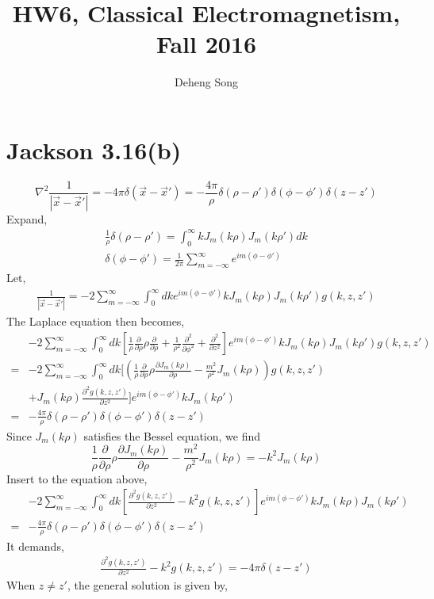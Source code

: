 \documentclass{article}
\newcommand{\pd}[2]{\frac{\partial#1}{\partial#2}}
\begin{document}
\title{HW6, Classical Electromagnetism, Fall 2016}
\author{Deheng Song}
\maketitle

\section*{Jackson 3.16(b)}
\[ \nabla^2\frac{1}{|\vec x-\vec x'|}=-4\pi\delta(\vec x-\vec x')=-\frac{4\pi}{\rho}\delta(\rho-\rho')\delta(\phi-\phi')\delta(z-z') \]
Expand,
\begin{align*}
  \frac{1}{\rho}\delta(\rho-\rho')=\int_0^\infty kJ_m(k\rho)J_m(k\rho')dk\\
  \delta(\phi-\phi')=\frac{1}{2\pi}\sum_{m=-\infty}^{\infty} e^{im(\phi-\phi')}
\end{align*}
Let,
\begin{align*}
  \frac{1}{|\vec x-\vec x'|}=-2\sum_{m=-\infty}^\infty\int_0^{\infty}dk e^{im(\phi-\phi')}kJ_m(k\rho)J_m(k\rho')g(k,z,z')
\end{align*}
The Laplace equation then becomes,
\begin{align*}
  &-2\sum_{m=-\infty}^\infty\int_0^\infty  dk[\frac{1}{\rho}\pd{}{\rho}\rho\pd{}{\rho}+\frac{1}{\rho^2}\pd{^2}{\phi^2}+\pd{^2}{z^2}]e^{im(\phi-\phi')}kJ_m(k\rho)J_m(k\rho')g(k,z,z')\\
  =&-2\sum_{m=-\infty}^\infty\int_0^\infty  dk[(\frac{1}{\rho}\pd{}{\rho}\rho\pd{J_m(k\rho)}{\rho}-\frac{m^2}{\rho^2}J_m(k\rho))g(k,z,z')\\
  &+J_m(k\rho)\pd{^2g(k,z,z')}{z^2}]e^{im(\phi-\phi')}kJ_m(k\rho')\\
  =&-\frac{4\pi}{\rho}\delta(\rho-\rho')\delta(\phi-\phi')\delta(z-z')
\end{align*}
Since $J_m(k\rho)$ satisfies the Bessel equation, we find
\[ \frac{1}{\rho}\pd{}{\rho}\rho\pd{J_m(k\rho)}{\rho}-\frac{m^2}{\rho^2}J_m(k\rho)=-k^2J_m(k\rho) \]
Insert to the equation above,
\begin{align*}
  &-2\sum_{m=-\infty}^\infty\int_0^\infty  dk[\pd{^2g(k,z,z')}{z^2}-k^2g(k,z,z')] e^{im(\phi-\phi')}kJ_m(k\rho)J_m(k\rho')\\
  =&-\frac{4\pi}{\rho}\delta(\rho-\rho')\delta(\phi-\phi')\delta(z-z')
\end{align*}
It demands,
\begin{align*}
  \pd{^2g(k,z,z')}{z^2}-k^2g(k,z,z')=-4\pi\delta(z-z')
\end{align*}
When $z\neq z'$, the general solution is given by,
\end{document}
